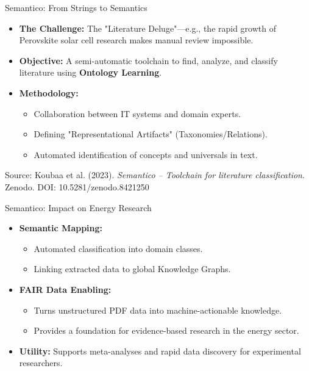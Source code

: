 \documentclass{beamer}
\begin{document}
\begin{frame}{Semantico: From Strings to Semantics}
    \begin{itemize}
        \item \textbf{The Challenge:} The "Literature Deluge"—e.g., the rapid growth of Perovskite solar cell research makes manual review impossible.
        \item \textbf{Objective:} A semi-automatic toolchain to find, analyze, and classify literature using \textbf{Ontology Learning}.
        \item \textbf{Methodology:} 
            \begin{itemize}
                \item Collaboration between IT systems and domain experts.
                \item Defining "Representational Artifacts" (Taxonomies/Relations).
                \item Automated identification of concepts and universals in text.
            \end{itemize}
    \end{itemize}
    \vfill
    \tiny{Source: Koubaa et al. (2023). \textit{Semantico – Toolchain for literature classification}. Zenodo. DOI: 10.5281/zenodo.8421250}
\end{frame}

\begin{frame}{Semantico: Impact on Energy Research}
    \begin{itemize}
        \item \textbf{Semantic Mapping:}
            \begin{itemize}
                \item Automated classification into domain classes.
                \item Linking extracted data to global Knowledge Graphs.
            \end{itemize}
        \item \textbf{FAIR Data Enabling:} 
            \begin{itemize}
                \item Turns unstructured PDF data into machine-actionable knowledge.
                \item Provides a foundation for evidence-based research in the energy sector.
            \end{itemize}
        \item \textbf{Utility:} Supports meta-analyses and rapid data discovery for experimental researchers.
    \end{itemize}
\end{frame}
\end{document}
